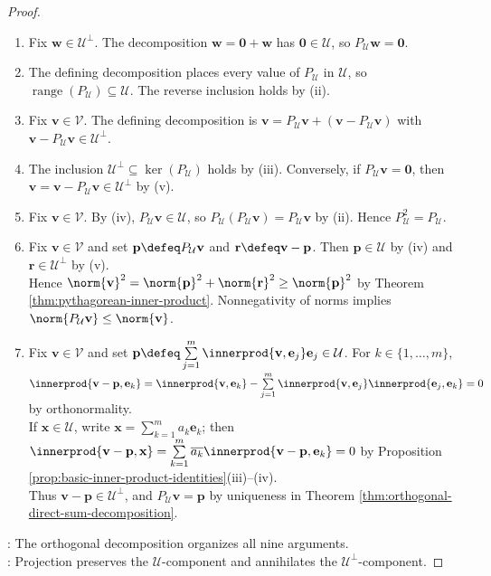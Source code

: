\begin{proposition}
\begin{proof}
\begin{enumerate}[label=(\roman*)]
\item Fix $\mathbf{w}\in\mathcal{U}^{\perp}$. The decomposition $\mathbf{w}=\mathbf{0}+\mathbf{w}$ has $\mathbf{0}\in\mathcal{U}$, so $P_{\mathcal{U}}\mathbf{w}=\mathbf{0}$.
\item The defining decomposition places every value of $P_{\mathcal{U}}$ in $\mathcal{U}$, so $\operatorname{range}(P_{\mathcal{U}})\subseteq\mathcal{U}$. The reverse inclusion holds by (ii).
\item Fix $\mathbf{v}\in\mathcal{V}$. The defining decomposition is $\mathbf{v}=P_{\mathcal{U}}\mathbf{v}+(\mathbf{v}-P_{\mathcal{U}}\mathbf{v})$ with $\mathbf{v}-P_{\mathcal{U}}\mathbf{v}\in\mathcal{U}^{\perp}$.
\item The inclusion $\mathcal{U}^{\perp}\subseteq\ker(P_{\mathcal{U}})$ holds by (iii). Conversely, if $P_{\mathcal{U}}\mathbf{v}=\mathbf{0}$, then $\mathbf{v}=\mathbf{v}-P_{\mathcal{U}}\mathbf{v}\in\mathcal{U}^{\perp}$ by (v).
\item Fix $\mathbf{v}\in\mathcal{V}$. By (iv), $P_{\mathcal{U}}\mathbf{v}\in\mathcal{U}$, so $P_{\mathcal{U}}(P_{\mathcal{U}}\mathbf{v})=P_{\mathcal{U}}\mathbf{v}$ by (ii). Hence $P_{\mathcal{U}}^2=P_{\mathcal{U}}$.
\item Fix $\mathbf{v}\in\mathcal{V}$ and set $\mathbf{p}\defeq P_{\mathcal{U}}\mathbf{v}$ and $\mathbf{r}\defeq\mathbf{v}-\mathbf{p}$. Then $\mathbf{p}\in\mathcal{U}$ by (iv) and $\mathbf{r}\in\mathcal{U}^{\perp}$ by (v).\\
Hence $\norm{\mathbf{v}}^2=\norm{\mathbf{p}}^2+\norm{\mathbf{r}}^2\geq\norm{\mathbf{p}}^2$ by Theorem \ref{thm:pythagorean-inner-product}. Nonnegativity of norms implies $\norm{P_{\mathcal{U}}\mathbf{v}}\leq\norm{\mathbf{v}}$.
\item Fix $\mathbf{v}\in\mathcal{V}$ and set $\mathbf{p}\defeq\sum\limits_{j=1}^{m}\innerprod{\mathbf{v},\mathbf{e}_j}\mathbf{e}_j\in\mathcal{U}$. For $k\in\{1,\ldots,m\}$, $\innerprod{\mathbf{v}-\mathbf{p},\mathbf{e}_k}=\innerprod{\mathbf{v},\mathbf{e}_k}-\sum\limits_{j=1}^{m}\innerprod{\mathbf{v},\mathbf{e}_j}\innerprod{\mathbf{e}_j,\mathbf{e}_k}=0$ by orthonormality. \\
If $\mathbf{x}\in\mathcal{U}$, write $\mathbf{x}=\sum\limits_{k=1}^{m}a_k\mathbf{e}_k$; then $\innerprod{\mathbf{v}-\mathbf{p},\mathbf{x}}=\sum\limits_{k=1}^{m}\overline{a_k}\innerprod{\mathbf{v}-\mathbf{p},\mathbf{e}_k}=0$ by Proposition \ref{prop:basic-inner-product-identities}(iii)--(iv).\\
Thus $\mathbf{v}-\mathbf{p}\in\mathcal{U}^{\perp}$, and $P_{\mathcal{U}}\mathbf{v}=\mathbf{p}$ by uniqueness in Theorem \ref{thm:orthogonal-direct-sum-decomposition}.
\end{enumerate}
: The orthogonal decomposition organizes all nine arguments.\\
: Projection preserves the $\mathcal{U}$-component and annihilates the $\mathcal{U}^{\perp}$-component.
\end{proof}
\end{proposition}

